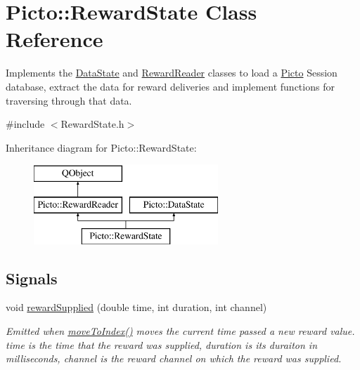 \hypertarget{class_picto_1_1_reward_state}{\section{Picto\-:\-:Reward\-State Class Reference}
\label{class_picto_1_1_reward_state}
}


Implements the \hyperlink{class_picto_1_1_data_state}{Data\-State} and \hyperlink{class_picto_1_1_reward_reader}{Reward\-Reader} classes to load a \hyperlink{namespace_picto}{Picto} Session database, extract the data for reward deliveries and implement functions for traversing through that data.  




{\ttfamily \#include $<$Reward\-State.\-h$>$}

Inheritance diagram for Picto\-:\-:Reward\-State\-:\begin{figure}[H]
\begin{center}
\leavevmode
\includegraphics[height=3.000000cm]{class_picto_1_1_reward_state}
\end{center}
\end{figure}
\subsection*{Signals}
\begin{DoxyCompactItemize}
\item 
\hypertarget{class_picto_1_1_reward_state_a1d10829fe64ff324aba508d04931759d}{void \hyperlink{class_picto_1_1_reward_state_a1d10829fe64ff324aba508d04931759d}{reward\-Supplied} (double time, int duration, int channel)}\label{class_picto_1_1_reward_state_a1d10829fe64ff324aba508d04931759d}

\begin{DoxyCompactList}\small\item\em Emitted when \hyperlink{class_picto_1_1_reward_state_a784e710cbd93bbc245a276b691326b12}{move\-To\-Index()} moves the current time passed a new reward value. time is the time that the reward was supplied, duration is its duraiton in milliseconds, channel is the reward channel on which the reward was supplied. \end{DoxyCompactList}\end{DoxyCompactItemize}
